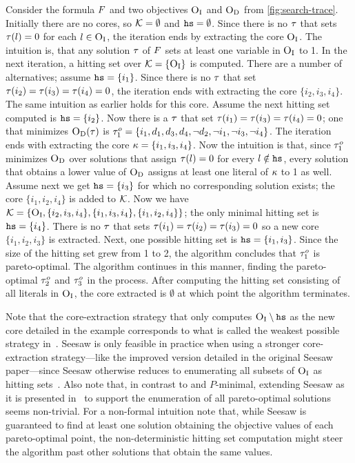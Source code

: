 \begin{example}
  Consider the formula $F$ and two objectives $\textsc{O}_{\text{I}}$ and $\textsc{O}_{\text{D}}$ from \cref{fig:search-trace}. 
  Initially there are no cores, so $\mathcal{K} = \emptyset$ and $\texttt{hs} = \emptyset$.
  Since there is no $\tau$ that sets $\tau(l) = 0$ for each $l \in \textsc{O}_{\text{I}}$, the iteration ends by extracting the core $\textsc{O}_{\text{I}}$. 
  The intuition is, that any solution $\tau$ of $F$ sets at least one variable in $\textsc{O}_{\text{I}}$ to 1.
  In the next iteration, a hitting set over $\mathcal{K} = \{ \textsc{O}_{\text{I}} \}$ is computed.
  There are a number of alternatives;
  assume $\texttt{hs} = \{ i_1 \}$.
  Since there is no $\tau$ that set $\tau(i_2) = \tau(i_3) = \tau(i_4) = 0$, the iteration ends with extracting the core $\{ i_2, i_3, i_4\}$.
  The same intuition as earlier holds for this core.
  Assume the next hitting set computed is $\texttt{hs} = \{i_2\}$.
  Now there is a $\tau$ that set $\tau(i_1) = \tau(i_3) = \tau(i_4) = 0$;
  one that minimizes $\textsc{O}_{\text{D}}(\tau)$ is $\tau^o_1 = {\{i_1,\allowbreak d_1,\allowbreak d_3,\allowbreak d_4,\allowbreak \lnot d_2,\allowbreak \lnot i_1,\allowbreak \lnot i_3,\allowbreak \lnot i_4\}}$.
  The iteration ends with extracting the core $\kappa = \{i_1, i_3, i_4\}$.
  Now the intuition is that, since $\tau^o_1$ minimizes $\textsc{O}_{\text{D}}$ over solutions that assign $\tau(l) = 0$ for every $l \notin \texttt{hs}$, every solution that obtains a lower value of $\textsc{O}_{\text{D}}$ assigns at least one literal of $\kappa$ to 1 as well. 
  Assume next we get $\texttt{hs} = \{i_3\}$ for which no corresponding solution exists;
  the core $\{i_1, i_2, i_4\}$ is added to $\mathcal{K}$.
  Now we have $\mathcal{K} = \{ \textsc{O}_{\text{I}}, \{i_2, i_3, i_4\}, \{i_1, i_3, i_4\}, \{i_1, i_2, i_4\}\}$;
  the only minimal hitting set is $\texttt{hs} = \{ i_4 \}$.
  There is no $\tau$ that sets $\tau(i_1) = \tau(i_2) = \tau(i_3) = 0$ so a new core $\{i_1, i_2, i_3\}$ is extracted. 
  Next, one possible hitting set is $\texttt{hs} = \{i_1, i_3\}$.
  Since the size of the hitting set grew from 1 to 2, the algorithm concludes that $\tau^o_1$ is pareto-optimal. 
  The algorithm continues in this manner, finding the pareto-optimal $\tau^o_2$ and $\tau^o_3$ in the process.
  After computing the hitting set consisting of all literals in $\textsc{O}_{\text{I}}$, the core extracted is $\emptyset$ at which point the algorithm terminates. 
\end{example}

Note that the core-extraction strategy that only computes $\textsc{O}_{\text{I}} \setminus \texttt{hs}$ as the new core detailed in the example corresponds to what is called the weakest possible strategy in~\textcite{DBLP:conf/cp/JanotaMSM21}.
Seesaw is only feasible in practice when using a stronger core-extraction strategy---like the improved version detailed in the original Seesaw paper---since Seesaw otherwise reduces to enumerating all subsets of $\textsc{O}_{\text{I}}$ as hitting sets~\autocite{DBLP:conf/cp/JanotaMSM21}.
Also note that, in contrast to \algname{} and $P$-minimal, extending Seesaw as it is presented in~\textcite{DBLP:conf/cp/JanotaMSM21} to support the enumeration of all pareto-optimal solutions seems non-trivial.
For a non-formal intuition note that, while Seesaw is guaranteed to find at least one solution obtaining the objective values of each pareto-optimal point, the non-deterministic hitting set computation might steer the algorithm past other solutions that obtain the same values.

